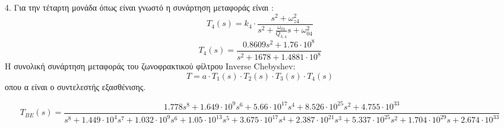 \documentclass{article}
\begin{document}
{{\begin{equation*}
\end{equation*}
4. Για την τέταρτη μονάδα όπως είναι γνωστό η συνάρτηση μεταφοράς είναι :
\begin{equation*}
T_4(s) =   k_4 \cdot \frac{s^2 + ω_{z4}^2}{s^2 + \frac{ω_{04}}{Q_{3,4}}s + ω_{04}^2}
\end{equation*}
\begin{equation*}
\boxed{
T_4(s) = \frac{0.8609 s^2+ 1.76 \cdot 10^8}{s^2 +1678+1.4881\cdot10^8}}
\end{equation*}
Η συνολική συνάρτηση μεταφοράς του ζωνοφρακτικού φίλτρου Inverse Chebyshev:
\begin{equation*}
T = a \cdot T_1(s) \cdot T_2(s) \cdot T_3(s) \cdot T_4(s)
\end{equation*}
οπου α είναι ο συντελεστής εξασθένισης.
\scriptsize{}
\begin{changemargin}{-2.3cm}{0.5cm} 
\begin{equation*}
T_{BE}(s) = \frac{1.778 s^8 + 1.649 \cdot 10^9 s^6 + 5.66 \cdot10^{17} s^4 + 8.526 \cdot10^{25} s^2 + 4.755 \cdot 10^{33}}{ s^8 + 1.449 \cdot 10^4 s^7 + 1.032\cdot 10^9 s^6 + 1.05\cdot 10^{13} s^5 + 3.675\cdot 10^{17} s^4 + 2.387\cdot 10^{21} s^3 + 5.337\cdot 10^{25} s^2 + 1.704\cdot 10^{29} s + 2.674\cdot 10^{33}}
\end{equation*}

\end{changemargin}

}}
\end{document}
